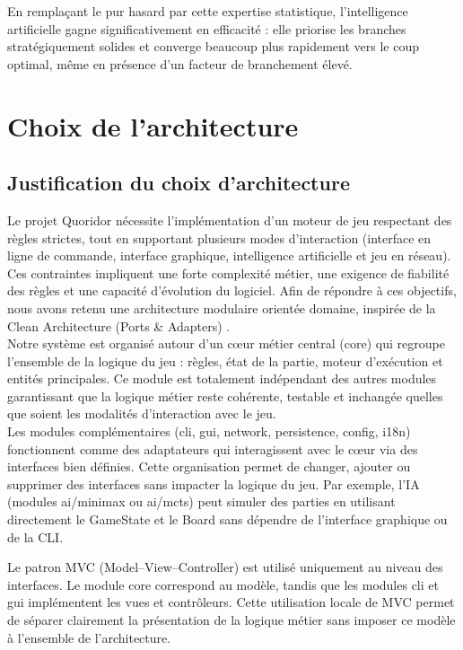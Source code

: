 \documentclass[a4paper]{article}
\begin{document}
En remplaçant le pur hasard par cette expertise statistique, l'intelligence
artificielle gagne significativement en efficacité : elle priorise les branches
stratégiquement solides et converge beaucoup plus rapidement vers le coup optimal,
même en présence d'un facteur de branchement élevé.

\section{Choix de l’architecture}
\subsection{Justification du choix d’architecture
}
Le projet Quoridor nécessite l’implémentation d’un moteur de jeu respectant
des règles strictes, tout en supportant plusieurs modes d’interaction (interface
en ligne de commande, interface graphique, intelligence artificielle et jeu en
réseau). Ces contraintes impliquent une forte complexité métier, une exigence
de fiabilité des règles et une capacité d’évolution du logiciel. Afin de répondre à ces objectifs, nous avons retenu une architecture modulaire orientée
domaine, inspirée de la Clean Architecture (Ports \& Adapters) \cite{martin2017clean}.\\

Notre système est organisé autour d’un cœur métier central (core) qui regroupe
l’ensemble de la logique du jeu : règles, état de la partie, moteur d’exécution
et entités principales. Ce module est totalement indépendant des autres modules garantissant que la logique métier reste cohérente,
testable et inchangée quelles que soient les modalités d’interaction avec le
jeu.\\

Les modules complémentaires (cli, gui, network, persistence, config, i18n) fonctionnent comme des adaptateurs qui interagissent avec le cœur via des interfaces bien définies. Cette organisation permet de changer, ajouter ou supprimer des interfaces sans impacter la logique du jeu. Par exemple, l’IA (modules ai/minimax ou ai/mcts) peut simuler des parties en utilisant directement le GameState et le Board sans dépendre de l’interface graphique ou de la CLI.

Le patron MVC (Model–View–Controller) est utilisé uniquement au niveau des
interfaces. Le module core correspond au modèle, tandis que les modules cli
et gui implémentent les vues et contrôleurs. Cette utilisation locale de MVC
permet de séparer clairement la présentation de la logique métier sans
imposer ce modèle à l’ensemble de l’architecture.\\
\end{document}

